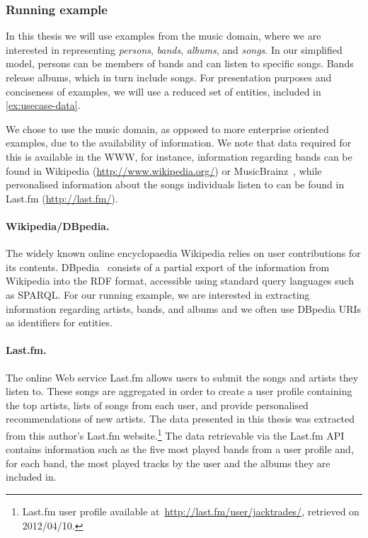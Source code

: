 \subsubsection*{Running example}
\label{sec:example}

In this thesis we will use examples from the music domain, where we are interested in representing \emph{persons},
\emph{bands}, \emph{albums}, and \emph{songs}.
%
In our simplified model, persons can be members of bands and can listen to specific songs.  Bands release albums, which
in turn include songs.
%
For presentation purposes and conciseness of examples, we will use a reduced set of entities, included in
\cref{ex:usecase-data}.

We chose to use the music domain, as opposed to more enterprise oriented examples, due to the availability of
information.
%
We note that data required for this \usecase is available in the \ac{WWW}, for instance, information regarding bands can
be found in Wikipedia (\url{http://www.wikipedia.org/}) or MusicBrainz~\cite{Swartz:2002aa}, while personalised
information about the songs individuals listen to can be found in Last.fm (\url{http://last.fm/}).


\paragraph*{Wikipedia/DBpedia.} The widely known online encyclopaedia Wikipedia relies on user contributions for its
contents.
%
DBpedia~\cite{BizerLehmannKobilarov:2009aa} consists of a partial export of the information from Wikipedia into the RDF
format, accessible using standard query languages such as SPARQL.
%
For our running example, we are interested in extracting information regarding artists, bands, and albums and we often
use DBpedia \acp{URI} as identifiers for entities.


\paragraph*{Last.fm.} The online Web service Last.fm allows users to submit the songs and artists they listen to.
%
These songs are aggregated in order to create a user profile containing the top artists, lists of songs from each user,
and provide personalised recommendations of new artists.
%
The data presented in this thesis was extracted from this author's Last.fm website.\footnote{Last.fm user profile
  available at~\url{http://last.fm/user/jacktrades/}, retrieved on 2012/04/10.}
%
The data retrievable via the Last.fm API contains information such as the five most played bands from a user profile
and, for each band, the most played tracks by the user and the albums they are included in.

